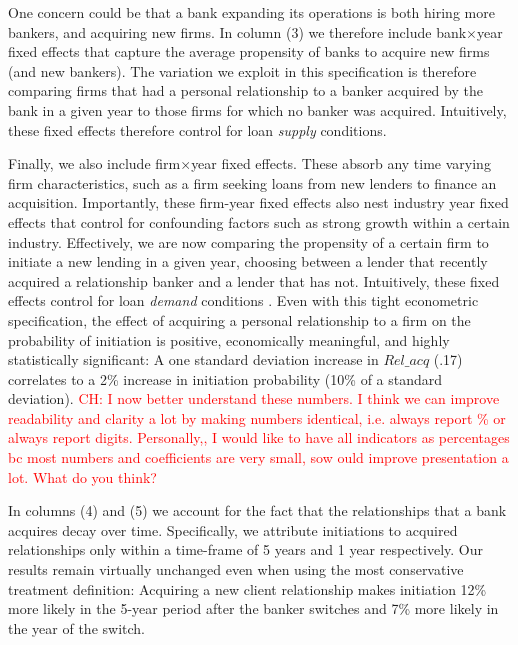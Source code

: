 One concern could be that a bank expanding its operations is both hiring more bankers, and acquiring new firms. In column (3) we therefore include bank$\times$year fixed effects that capture the average propensity of banks to acquire new firms (and new bankers). The variation we exploit in this specification is therefore comparing firms that had a personal relationship to a banker acquired by the bank in a given year to those firms for which no banker was acquired. Intuitively, these fixed effects therefore control for loan \textit{supply} conditions. 

Finally, we also include firm$\times$year fixed effects. These absorb any time varying firm characteristics, such as a firm seeking loans from new lenders to finance an acquisition. Importantly, these firm-year fixed effects also nest industry year fixed effects that control for confounding factors such as strong growth within a certain industry. Effectively, we are now comparing the propensity of a certain firm to initiate a new lending in a given year, choosing between a lender that recently acquired a relationship banker and a lender that has not. Intuitively, these fixed effects control for loan \textit{demand} conditions \citep{jakovljevic2020}. Even with this tight econometric specification, the effect of acquiring a personal relationship to a firm on the probability of initiation is positive, economically meaningful, and highly statistically significant: A one standard deviation increase in $Rel\_acq$ (.17) correlates to a 2\% increase in initiation probability (10\% of a standard deviation). \textcolor{red}{CH: I now better understand these numbers. I think we can improve readability and clarity a lot by making numbers identical, i.e. always report \% or always report digits. Personally,, I would like to have all indicators as percentages bc most numbers and coefficients are very small, sow ould improve presentation a lot. What do you think?}

In columns (4) and (5) we account for the fact that the relationships that a bank acquires decay over time. Specifically, we attribute initiations to acquired relationships only within a time-frame of 5 years and 1 year respectively. Our results remain virtually unchanged even when using the most conservative treatment definition: Acquiring a new client relationship makes initiation 12\% more likely in the 5-year period after the banker switches and 7\% more likely in the year of the switch.

